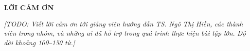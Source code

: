 \documentclass[../DoAn.tex]{subfiles}
\begin{document}
\begin{center}
    \Large{\textbf{LỜI CẢM ƠN}}\\
\end{center}
\vspace{1cm}

\textit{[TODO: Viết lời cảm ơn tới giảng viên hướng dẫn TS. Ngô Thị Hiền, các thành viên trong nhóm, và những ai đã hỗ trợ trong quá trình thực hiện bài tập lớn. Độ dài khoảng 100--150 từ.]}
\end{document}
